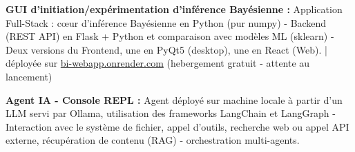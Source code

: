 \documentclass[10pt,a4paper]{article}
\begin{document}
\textbf{GUI d'initiation/expérimentation d'inférence Bayésienne :} Application Full-Stack : cœur d'inférence Bayésienne en Python (pur numpy) 
- Backend (REST API) en Flask + Python et comparaison avec modèles ML (sklearn) -
Deux versions du Frontend, une en PyQt5 (desktop), une en React (Web).  | 
déployée sur \href{https://bi-webapp.onrender.com}{bi-webapp.onrender.com} (hebergement gratuit - attente au lancement)

\textbf{Agent IA - Console REPL : }
Agent déployé sur machine locale à partir d'un LLM servi par Ollama, utilisation des frameworks LangChain et LangGraph - Interaction avec le système de fichier, appel d'outils,
recherche web ou appel API externe, récupération de contenu (RAG) - orchestration multi-agents.

\end{document}
